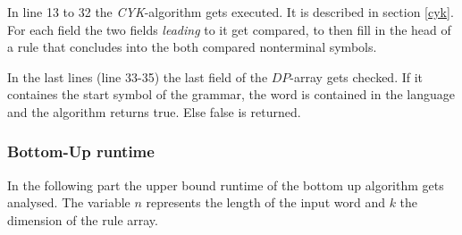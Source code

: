 \documentclass[a4paper, 11pt]{article}
\begin{document}
In line 13 to 32 the \textit{CYK}-algorithm gets executed. It is described in section \ref{cyk}. For each field the two fields \textit{leading} to it get compared, to then fill in the head of a rule that concludes into the both compared nonterminal symbols.


In the last lines (line 33-35) the last field of the $DP$-array gets checked. If it containes the start symbol of the grammar, the word is contained in the language and the algorithm returns true. Else false is returned.




\subsubsection{Bottom-Up runtime}
\label{bottomupruntime}

In the following part the upper bound runtime of the bottom up algorithm gets analysed.
The variable $n$ represents the length of the input word and $k$ the dimension of the rule array. \\
\end{document}
